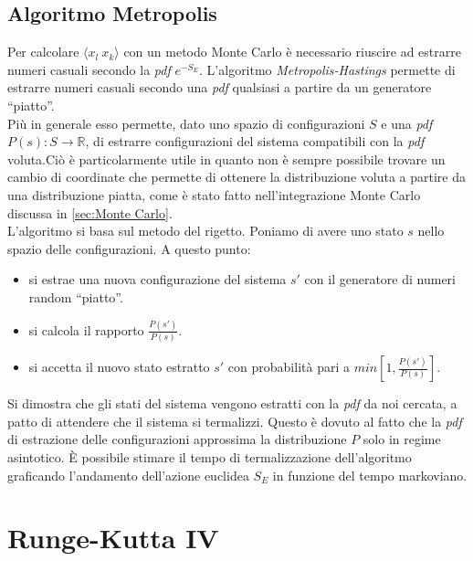 \section*{Algoritmo Metropolis}
Per calcolare $\langle x_l \ x_k \rangle $ con un metodo Monte Carlo è necessario riuscire ad estrarre numeri casuali secondo la \emph{pdf} $ e^{-S_E}$.
L'algoritmo \emph{Metropolis-Hastings} permette di estrarre numeri casuali secondo una \emph{pdf} qualsiasi a partire da un generatore ``piatto''.\\
Più in generale esso permette, dato uno spazio di configurazioni $S$ e una \emph{pdf} $ P(s) : S \rightarrow \mathbb{R}$, di estrarre
configurazioni del sistema compatibili con la \emph{pdf} voluta.Ciò è particolarmente utile in quanto non è sempre possibile trovare un cambio
di coordinate che permette di ottenere la distribuzione voluta a partire da una distribuzione piatta,
come è stato fatto nell'integrazione Monte Carlo discussa in \ref{sec:Monte Carlo}.\\
L'algoritmo si basa sul metodo del rigetto. Poniamo di avere uno stato $s$ nello spazio delle configurazioni. A questo punto:
\begin{itemize}
\item si estrae una nuova configurazione del sistema $s'$ con il generatore di numeri random ``piatto''.
\item si calcola il rapporto $ \frac{P(s')}{P(s)}$.
\item si accetta il nuovo stato estratto $s'$ con probabilità pari a $ min\left[ 1,\frac{P(s')}{P(s)} \right]$.
\end{itemize}
Si dimostra che gli stati del sistema vengono estratti con la \emph{pdf} da noi cercata,
a patto di attendere che il sistema si termalizzi. Questo è dovuto al fatto che la \emph{pdf} di estrazione delle configurazioni approssima la distribuzione $P$ solo in regime asintotico.
È possibile stimare il tempo di termalizzazione dell'algoritmo graficando l'andamento dell'azione euclidea $S_E$ in funzione del tempo markoviano.\\

\chapter{Runge-Kutta IV}

